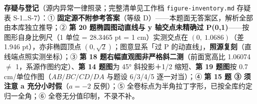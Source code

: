 \begin{gktip}
\textbf{存疑与登记}（源内异常一律照录；完整清单见工作档 \texttt{figure-inventory.md} 存疑表 S-1…S-7）：① \textbf{固定源不附参考答案}（等级 D）——本题面无答案区，解析全部由本库独立推导；② \textbf{第 20 题椭圆图动直线与 y 轴交点未精确过 P(0,1)}——按图形自身比例尺（1 单位 = 28.3465 pt = 1 cm）实测交点在 \((0,\ 1.0686)\)（差 1.946 pt），亦非椭圆顶点 \((0,\sqrt{2})\)；图意显系「过 P 的动直线」，\textbf{照源复刻}（直线端点照实测坐标）；③ \textbf{第 18 题右幅直观图非严格斜二测}（前面宽高比 1.06074 $\neq$ 1，系源作图约定）、\textbf{第 14 题图}为 45° 斜投影＋1/2 缩短、\textbf{第 19 题图}按 0.7 cm/单位作图（\(AB/BC/CD/DA\) 与题设 6/3/4/5 逐一对当）；④ \textbf{第 15 题 ③ 须注意 a 充分小时假}（\(a=-2\) 反例）；⑤ 全卷标点为半角拉丁字形，已按全库约定归一全角；⑥ 全卷无分值印制，不录不补。
\end{gktip}



